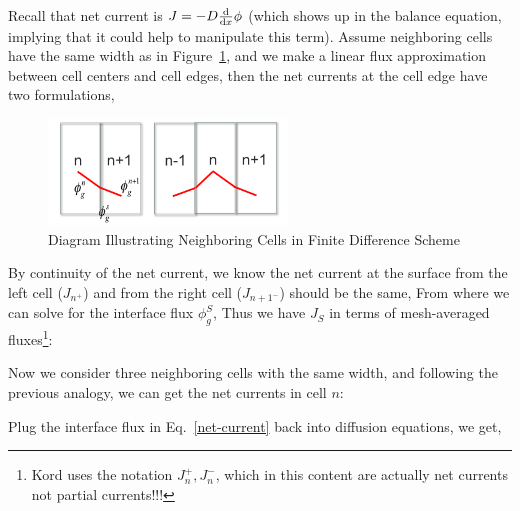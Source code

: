 \documentclass{school-22.211-notes}
\begin{document}
Recall that net current is $J = -D \frac{\mathrm{d}}{\mathrm{d}x} \phi$ (which shows up in the balance equation, implying that it could help to manipulate this term). Assume neighboring cells have the same width as in Figure~\ref{diagram-finite-difference}, and we make a linear flux approximation between cell centers and cell edges, then the net currents at the cell edge have two formulations, 
\begin{figure}[ht]
  \centering
  \includegraphics[width=2.5in]{images/dfs/diagram-finite-difference.png}
  \caption{Diagram Illustrating Neighboring Cells in Finite Difference Scheme} \label{diagram-finite-difference}
\end{figure}

By continuity of the net current, we know the net current at the surface from the left cell ($J_{n^+}$) and from the right cell ($J_{{n+1}^-}$) should be the same,
From where we can solve for the interface flux $\phi_g^S$, 
Thus we have $J_S$ in terms of mesh-averaged fluxes\footnote{Kord uses the notation $J_n^+, J_n^-$, which in this content are actually net currents not partial currents!!!}: 

Now we consider three neighboring cells with the same width, and following the previous analogy, we can get the net currents in cell $n$:


Plug the interface flux in Eq.~\ref{net-current} back into diffusion equations, we get, 
\end{document}
